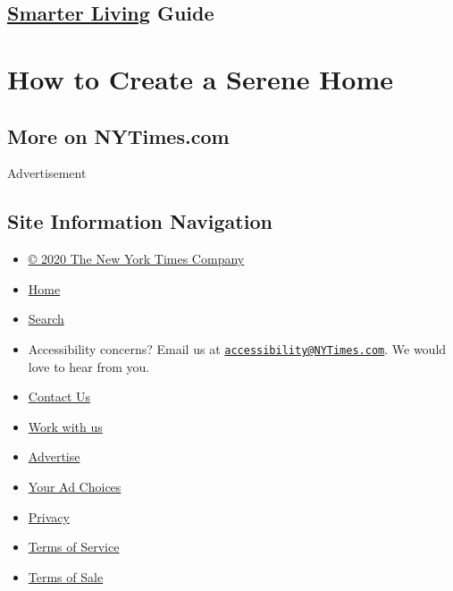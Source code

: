 \hypertarget{-smarter-living--guide}{%
\subsection{\texorpdfstring{ \href{/section/smarter-living}{Smarter
Living}
\textbar{}Guide}{ Smarter Living  \textbar{}Guide}}\label{-smarter-living--guide}}

\hypertarget{how-to-create-a-serene-home}{%
\section{How to Create a Serene
Home}\label{how-to-create-a-serene-home}}

\hypertarget{more-on-nytimescom}{%
\subsection{More on NYTimes.com}\label{more-on-nytimescom}}

Advertisement

\hypertarget{site-information-navigation}{%
\subsection{Site Information
Navigation}\label{site-information-navigation}}

\begin{itemize}
\tightlist
\item
  \href{https://help.nytimes3xbfgragh.onion/hc/en-us/articles/115014792127-Copyright-notice}{©
  2020 The New York Times Company}
\item
  \href{https://www.nytimes3xbfgragh.onion}{Home}
\item
  \href{https://www.nytimes3xbfgragh.onion/search/}{Search}
\item
  Accessibility concerns? Email us at
  \href{mailto:accessibility@NYTimes.com}{\nolinkurl{accessibility@NYTimes.com}}.
  We would love to hear from you.
\item
  \href{https://help.nytimes3xbfgragh.onion/hc/en-us/articles/115015385887-Contact-Us}{Contact
  Us}
\item
  \href{https://www.nytco.com/careers/}{Work with us}
\item
  \href{https://nytmediakit.com/}{Advertise}
\item
  \href{https://help.nytimes3xbfgragh.onion/hc/en-us/articles/115014892108-Privacy-policy\#pp}{Your
  Ad Choices}
\item
  \href{https://help.nytimes3xbfgragh.onion/hc/en-us/articles/115014892108-Privacy-policy}{Privacy}
\item
  \href{https://help.nytimes3xbfgragh.onion/hc/en-us/articles/115014893428-Terms-of-service}{Terms
  of Service}
\item
  \href{https://help.nytimes3xbfgragh.onion/hc/en-us/articles/115014893968-Terms-of-sale}{Terms
  of Sale}
\end{itemize}

